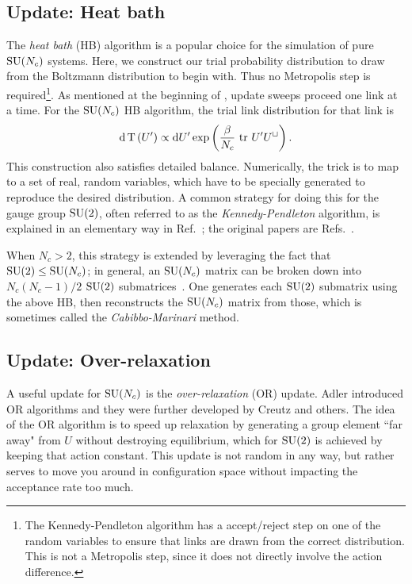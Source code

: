 \subsection{Update: Heat bath}

The {\it heat bath} (HB) algorithm is a popular choice for the simulation
of pure $\operatorname{SU}(N_c)$ systems. Here, we construct our trial probability distribution 
to draw from the Boltzmann distribution to begin with. Thus no
Metropolis step is required\footnote{The Kennedy-Pendleton algorithm has a
accept/reject step on one of the random variables to ensure that
links are drawn from the correct distribution. This is not 
a Metropolis step, since it does not directly involve the action difference.}. 
As mentioned at the beginning of ,
update sweeps proceed one link at a time.
For the $\operatorname{SU}(N_c)$ HB algorithm, the trial link distribution for that link is
\begin{equation}\label{eq:PTdist}
  \dd{\operatorname{T}\left(U'\right)}\propto \dd U'\exp\left(\frac{\beta}{N_c}\,\tr\,
  U'U^\sqcup\right).
\end{equation}
This construction also satisfies detailed balance. 
Numerically, the trick is to map  to a set
of real, random variables, which have to be specially
generated to reproduce the desired distribution.
A common strategy for doing this for the gauge group $\operatorname{SU}(2)$,
often referred to as the {\it Kennedy-Pendleton} algorithm, is explained in an elementary way 
in Ref.~\cite{gattringer_quantum_2010}; the original papers are
Refs.~\cite{fabricius_heat_1984,kennedy_improved_1985}.

When $N_c>2$, this strategy is extended by leveraging the fact
that $\operatorname{SU}(2)\leq\operatorname{SU}(N_c)$; in general, an $\operatorname{SU}(N_c)$ matrix
can be broken down into $N_c(N_c-1)/2$ 
$\operatorname{SU}(2)$ submatrices~\cite{cabibbo_new_1982}. One generates each
$\operatorname{SU}(2)$ submatrix using the above HB, then reconstructs
the $\operatorname{SU}(N_c)$ matrix from those, which is sometimes called
the {\it Cabibbo-Marinari} method.


\subsection{Update: Over-relaxation}

A useful update for $\operatorname{SU}(N_c)$ is the 
{\it over-relaxation} (OR) update. 
Adler introduced OR algorithms \cite{adler_over-relaxation_1981} and 
they were further developed by Creutz \cite{creutz_overrelaxation_1987} 
and others. The idea of the OR algorithm is to speed up relaxation 
by generating a group element ``far away" from $U$ without
destroying equilibrium, which for $\operatorname{SU}(2)$ is achieved by keeping that action
constant. 
This update is not random in any way, but rather serves to move you around
in configuration space without impacting the acceptance rate too much.

